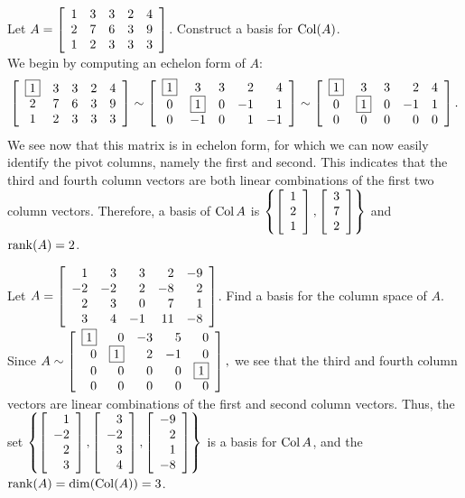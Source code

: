 \begin{Exam}\label{exam:columnspacebasis} Let $A = \mtx{rrrrr}{1&3&3&2&4\\2&7&6&3&9\\1&2&3&3&3}$. Construct a basis for $\col(A)$. \\

We begin by computing an echelon form of $A$:
\[\mtx{crrrr}{\fbox{$1$}&3&3&2&4\\2&7&6&3&9\\1&2&3&3&3} \sim \mtx{ccrrr}{\fbox{$1$}&3&3&2&4\\0&\fbox{$1$}&0&-1&1\\0&-1&0&1&-1} \sim \mtx{ccrrr}{\fbox{$1$}&3&3&2&4\\0&\fbox{$1$}&0&-1&1\\0&0&0&0&0}.\] We see now that this matrix is in echelon form, for which we can now easily identify the pivot columns, namely the first and second. This indicates that the third and fourth column vectors are both linear combinations of the first two column vectors. Therefore, a basis of $\col A$ is $\left\{\vr{1\\2\\1}, \vr{3\\7\\2}\right\}$ and $\rank(A) = 2$.\end{Exam}\vs

\begin{Exam} Let $A = \mtx{rrrrr}{1&3&3&2&-9\\-2&-2&2&-8&2\\2&3&0&7&1\\3&4&-1&11&-8}$. Find a basis for the column space of $A$.\\

Since $A\sim \mtx{rrrrr}{\fbox{$1$}&0&-3&5&0\\0&\fbox{$1$}&2&-1&0\\0&0&0&0&\fbox{$1$}\\0&0&0&0&0},$ we see that the third and fourth column vectors are linear combinations of the first and second column vectors. Thus, the set  
$\left\{\vr{1\\-2\\2\\3}, \vr{3\\-2\\3\\4}, \vr{-9\\2\\1\\-8}\right\}$ is a basis for $\col A$, and the $\rank(A) = \dim(\col(A)) = 3$.
\end{Exam}\vs

